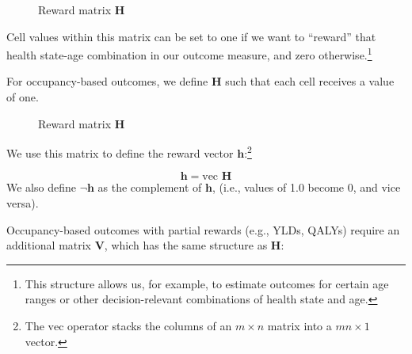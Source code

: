 \documentclass[
]{agujournal2019}
\begin{document}
\begin{figure}


\caption{\label{fig-H-le}Reward matrix \(\mathbf{H}\)}

\end{figure}%

Cell values within this matrix can be set to one if we want to
``reward'' that health state-age combination in our outcome measure, and
zero otherwise.\footnote{This structure allows us, for example, to
  estimate outcomes for certain age ranges or other decision-relevant
  combinations of health state and age.}

For occupancy-based outcomes, we define \(\mathbf{H}\) such that each
cell receives a value of one.

\begin{figure}


\caption{\label{fig-H}Reward matrix \(\mathbf{H}\)}

\end{figure}%

We use this matrix to define the reward vector
\(\mathbf{h}\):\footnote{The \(\text{vec}\) operator stacks the columns
  of an \(m \times n\) matrix into a \(mn \times 1\) vector.}

\[
\mathbf{h} = \text{vec } \mathbf{H}
\] We also define \(\neg \mathbf{h}\) as the complement of
\(\mathbf{h}\), (i.e., values of 1.0 become 0, and vice versa).

Occupancy-based outcomes with partial rewards (e.g., YLDs, QALYs)
require an additional matrix \(\mathbf{V}\), which has the same
structure as \(\mathbf{H}\):
\end{document}
